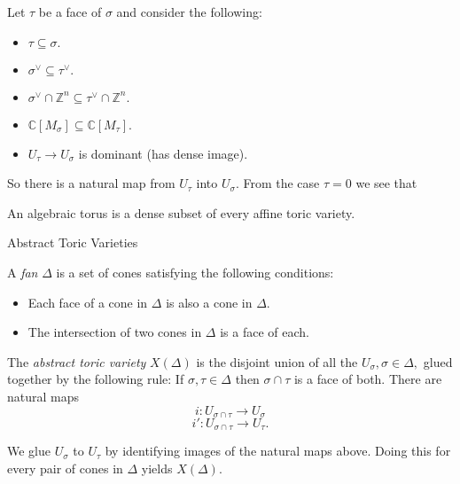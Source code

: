 \documentclass{beamer}
\newcommand{\C}{\mathbb{C}}
\newcommand{\Z}{\mathbb{Z}}
\begin{document}
\begin{frame}
 Let $\tau$ be a face of $\sigma$ and consider the following:

\begin{itemize}
 \item $\tau\subseteq \sigma.$
\item $\sigma^{\vee} \subseteq \tau^{\vee}.$
\item $\sigma^{\vee} \cap \Z^n \subseteq \tau^{\vee}\cap \Z^n.$
\item $\C[M_{\sigma}] \subseteq \C[M_{\tau}].$
\item $U_{\tau} \to U_{\sigma}$ is dominant (has dense image).
\end{itemize}
So there is a natural map from $U_{\tau}$ into $U_{\sigma}.$ From the case $\tau = 0$ we see that

\begin{Theorem} An algebraic torus is a dense subset of every affine toric variety.

\end{Theorem}

\end{frame}

\begin{frame}{Abstract Toric Varieties}
 \begin{Definition}
  A {\em fan} $\Delta$ is a set of cones satisfying the following conditions:

\begin{itemize}
 \item Each face of a cone in $\Delta$ is also a cone in $\Delta.$
\item The intersection of two cones in $\Delta$ is a face of each.
\end{itemize}

The {\em abstract toric variety} $X(\Delta)$ is the disjoint union of all the $U_{\sigma}, \sigma \in \Delta,$ glued together by the following rule: If $\sigma, \tau \in \Delta$ then $\sigma \cap \tau$ is a face of both. There are natural maps $$ i: U_{\sigma\cap \tau} \to U_{\sigma}$$ $$ i' : U_{\sigma \cap \tau} \to U_{\tau}.$$

We glue $U_{\sigma} $ to $U_{\tau}$ by identifying images of the natural maps above. Doing this for every pair of cones in $\Delta$ yields $X(\Delta).$

 \end{Definition}

\end{frame}
\end{document}
